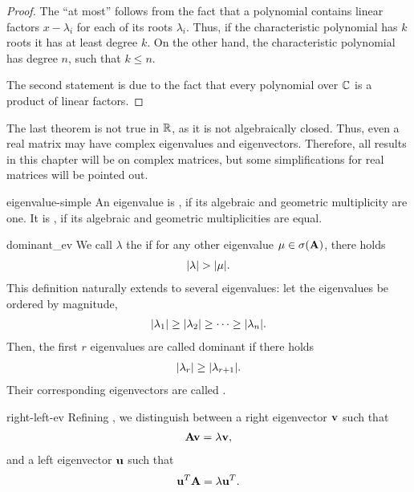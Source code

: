 \begin{proof}
  The ``at most'' follows from the fact that a polynomial contains
  linear factors $x-\lambda_i$ for each of its roots
  $\lambda_i$. Thus, if the characteristic polynomial has $k$ roots it
  has at least degree $k$. On the other hand, the characteristic
  polynomial has degree $n$, such that $k\le n$.

  The second statement is due to the fact that every polynomial over
  $\mathbb C$ is a product of linear factors.
\end{proof}

\begin{remark}
  The last theorem is not true in $\mathbb R$, as it is not algebraically
  closed. Thus, even a real matrix may have complex eigenvalues and
  eigenvectors. Therefore, all results in this chapter will be on
  complex matrices, but some simplifications for real matrices will be
  pointed out.
\end{remark}

\begin{Definition}{eigenvalue-simple}
  An eigenvalue is , if its algebraic and geometric multiplicity are one. It is , if its algebraic and geometric multiplicities are equal.
\end{Definition}

\begin{Definition}{dominant_ev}
  We call $\lambda$ the  if for any other
  eigenvalue $\mu\in\sigma(\mathbf A)$, there holds
  \begin{gather}
    \lvert\lambda\rvert > \lvert\mu\rvert.
  \end{gather}
  This definition naturally extends to several eigenvalues: let the
  eigenvalues be ordered by magnitude,
  \begin{gather}
    \lvert\lambda_{1}\rvert \ge \lvert\lambda_{2}\rvert \ge \dots \ge \lvert\lambda_{n}\rvert.
  \end{gather}
  Then, the first $r$ eigenvalues are called dominant if there holds
  \begin{gather}
    \lvert\lambda_{r}\rvert \ge\lvert\lambda_{r+1}\rvert.  
  \end{gather}
  Their corresponding eigenvectors are called .
\end{Definition}
\begin{Definition}{right-left-ev}
  Refining , we distinguish between a right eigenvector $\mathbf v$ such that
  \begin{gather*}
    \mathbf A \mathbf v = \lambda \mathbf v,
  \end{gather*}
  and a left eigenvector $\mathbf u$ such that
  \begin{gather*}
    \mathbf u^T \mathbf A = \lambda \mathbf u^T.
  \end{gather*}
\end{Definition}

